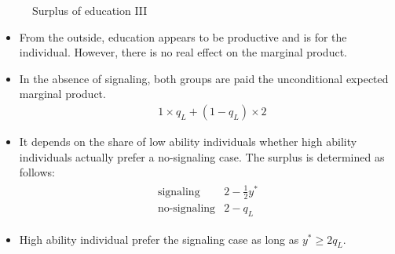 \begin{frame}\begin{figure}[htp]\centering
\caption{Surplus of education III}
\end{figure}\end{frame}
\begin{frame}
\begin{itemize}\setlength\itemsep{1em}
\item From the outside, education appears to be productive and is for the individual. However, there is no real effect on the marginal product.
\end{itemize}
\end{frame}
\begin{frame}
\begin{itemize}\setlength\itemsep{1em}
\item In the absence of signaling, both groups are paid the unconditional expected marginal product.
	\begin{align*}
	   & 1\times q_L + (1 - q_L) \times 2
	\end{align*}
\end{itemize}
\end{frame}
\begin{frame}
\begin{itemize}\setlength\itemsep{1em}
\item It depends on the share of low ability individuals whether high ability individuals actually prefer a no-signaling case. The surplus is determined as follows:
	\begin{align*}\begin{array}{ll}
	\text{signaling}    & 2 - \tfrac{1}{2} y^* \\
	\text{no-signaling} & 2 - q_L
	\end{array}\end{align*}
\item High ability individual prefer the signaling case as long as $y^* \geq 2 q_L$.
\end{itemize}
\end{frame}
